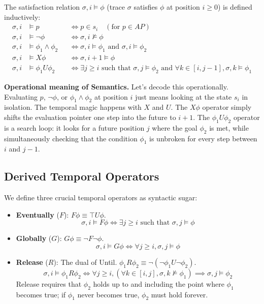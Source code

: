 \begin{definition}
\label{def:ltl-semantics}
The satisfaction relation $\sigma, i \models \phi$ (trace $\sigma$ satisfies $\phi$ at position $i \ge 0$) is defined inductively:
\begin{align*}
  \sigma, i &\models p &&\iff p \in s_i \quad (\text{for } p \in AP) \\
  \sigma, i &\models \neg \phi &&\iff \sigma, i \not\models \phi \\
  \sigma, i &\models \phi_1 \land \phi_2 &&\iff \sigma, i \models \phi_1 \text{ and } \sigma, i \models \phi_2 \\
  \sigma, i &\models X \phi &&\iff \sigma, i+1 \models \phi \\
  \sigma, i &\models \phi_1 U \phi_2 &&\iff \exists j \ge i \text{ such that } \sigma, j \models \phi_2 \text{ and } \forall k \in [i, j-1], \sigma, k \models \phi_1
\end{align*}
\end{definition}

\medskip\noindent
\textbf{Operational meaning of Semantics.} Let's decode this operationally. Evaluating $p$, $\neg\phi$, or $\phi_1 \land \phi_2$ at position $i$ just means looking at the state $s_i$ in isolation. The temporal magic happens with $X$ and $U$. The $X \phi$ operator simply shifts the evaluation pointer one step into the future to $i+1$. The $\phi_1 U \phi_2$ operator is a search loop: it looks for a future position $j$ where the goal $\phi_2$ is met, while simultaneously checking that the condition $\phi_1$ is unbroken for every step between $i$ and $j-1$.

\subsection{Derived Temporal Operators}
We define three crucial temporal operators as syntactic sugar:
\begin{itemize}
    \item \textbf{Eventually} ($F$): $F \phi \equiv \top U \phi$.
          \[
            \sigma, i \models F \phi \iff \exists j \ge i \text{ such that } \sigma, j \models \phi
          \]
    \item \textbf{Globally} ($G$): $G \phi \equiv \neg F \neg \phi$.
          \[
            \sigma, i \models G \phi \iff \forall j \ge i, \sigma, j \models \phi
          \]
    \item \textbf{Release} ($R$): The dual of Until. $\phi_1 R \phi_2 \equiv \neg(\neg\phi_1 U \neg\phi_2)$.
          \[
            \sigma, i \models \phi_1 R \phi_2 \iff \forall j \ge i, \left( \forall k \in [i, j], \sigma, k \not\models \phi_1 \right) \implies \sigma, j \models \phi_2
          \]
          Release requires that $\phi_2$ holds up to and including the point where $\phi_1$ becomes true; if $\phi_1$ never becomes true, $\phi_2$ must hold forever.
\end{itemize}

